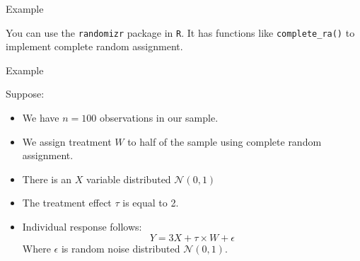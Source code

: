 \documentclass[xcolor={dvipsnames},handout]{beamer}
\begin{document}

\begin{frame}{Example}

You can use the \texttt{randomizr} package in \texttt{R}. It has functions like \texttt{complete\_ra()} to implement complete random assignment.

\end{frame}



\begin{frame}{Example}

Suppose:
\begin{itemize}
\item We have $n = 100$ observations in our sample.
\item We assign treatment $W$ to half of the sample using complete random assignment.
\item There is an $X$ variable distributed $\mathcal{N}(0,1)$
\item The treatment effect $\tau$ is equal to 2.
\item Individual response follows:
\[
Y = 3X + \tau \times W + \epsilon
\]
Where $\epsilon$ is random noise distributed $\mathcal{N}(0,1)$.
\end{itemize}

\end{frame}



\end{document}
